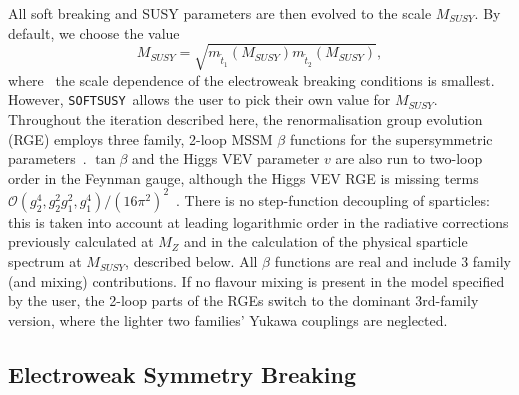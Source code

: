 \documentclass{article}
\def\SOFTSUSY{{\tt SOFTSUSY}}
\begin{document}
All soft breaking and SUSY parameters are then evolved to the scale
$M_{SUSY}$. By default, we choose the value
\begin{equation}
M_{SUSY} =\sqrt{m_{{\tilde t}_1}(M_{SUSY}) m_{{\tilde t}_2}(M_{SUSY})}, \label{msusy}
\end{equation}
where~\cite{Casas:1998vh} the scale dependence of the electroweak
breaking conditions is smallest. However, \SOFTSUSY~allows the user to pick
their own value for $M_{SUSY}$.
Throughout the iteration described here, the renormalisation group evolution
(RGE) employs three family,
2-loop MSSM $\beta$ functions for the supersymmetric
parameters~\cite{Barger:1994gh}.
$\tan \beta$ and the Higgs VEV
parameter $v$ are also run to two-loop order in the Feynman gauge, although
the Higgs VEV RGE is missing terms ${\mathcal O}(g_2^4, g_2^2 g_1^2,
g_1^4) / (16 \pi^2)^2$~\cite{Martin:2001vx,Yamada:2001ck}. 
There is no
step-function decoupling of sparticles: this is taken into account at leading
logarithmic order in the radiative corrections previously calculated at $M_Z$
and in the calculation of the physical sparticle spectrum at $M_{SUSY}$, described
below. All $\beta$ functions are real and include 3 family (and mixing)
contributions. If no flavour mixing is present in the model specified by the
user, the 2-loop parts of the RGEs switch to the dominant 3rd-family version,
where the lighter two families' Yukawa couplings are neglected.

\subsection{Electroweak Symmetry Breaking}
\end{document}

